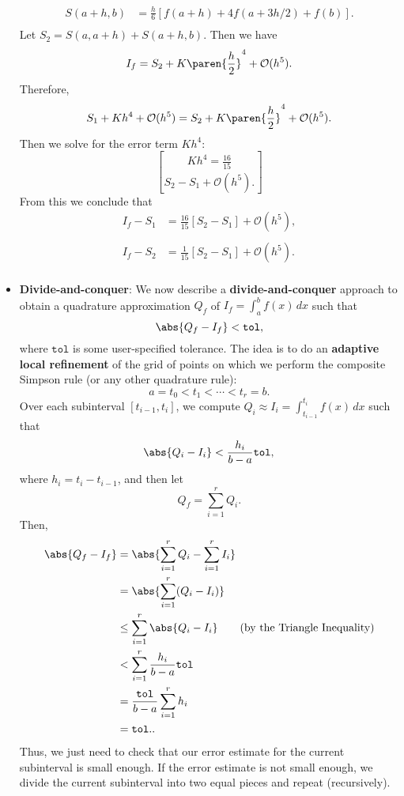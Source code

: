 \documentclass{report}
\begin{document}
\begin{itemize}
\begin{align*}
                S(a+h,b) &= \frac{h}{6}\left[f(a+h) + 4f(a + 3h/2) + f(b)\right].\\
            \end{align*}
            Let $S_2 = S(a,a+h) + S(a+h,b)$.
            \bigbreak \noindent 
            Then we have
            $$I_f = S_2 + K\paren{\frac{h}{2}}^4 + \mathcal{O}(h^5).$$
            \bigbreak \noindent 
            Therefore,
            $$S_1 + Kh^4 + \mathcal{O}(h^5) = S_2 + K\paren{\frac{h}{2}}^4 + \mathcal{O}(h^5).$$
            Then we solve for the error term $Kh^4$:
            $$Kh^4 = \frac{16}{15}\brack{S_2 - S_1} + \mathcal{O}(h^5).$$
            \bigbreak \noindent 
            From this we conclude that
            \begin{align*}
                I_f - S_1 &= \frac{16}{15}\left[S_2 - S_1\right] + \mathcal{O}(h^5),\\
                \\
                I_f - S_2 &= \frac{1}{15}\left[S_2 - S_1\right] + \mathcal{O}(h^5).\\
            \end{align*}
        \item \textbf{Divide-and-conquer}: We now describe a \textbf{divide-and-conquer} approach to obtain a quadrature approximation $Q_f$ of $I_f = \int_a^b f(x)\,dx$ such that
            $$\abs{Q_f - I_f} < \mathtt{tol},$$
            where $\mathtt{tol}$ is some user-specified tolerance.
            \bigbreak \noindent 
            The idea is to do an \textbf{adaptive local refinement} of the grid of points on which we perform the composite Simpson rule (or any other quadrature rule):
            $$a = t_0 < t_1 < \cdots < t_r = b.$$
            Over each subinterval $[t_{i-1}, t_i]$, we compute $Q_i \approx I_i = \int_{t_{i-1}}^{t_i} f(x)\,dx$ such that
            $$\abs{Q_i - I_i} < \frac{h_i}{b-a}\mathtt{tol},$$
            where $h_i = t_i - t_{i-1}$, and then let
            $$Q_f = \sum_{i=1}^r Q_i.$$
            Then,
            \begin{align*}
                \abs{Q_f - I_f}
                &= \abs{\sum_{i=1}^r Q_i - \sum_{i=1}^r I_i} \\
                &= \abs{\sum_{i=1}^r (Q_i - I_i)} \\
                &\leq \sum_{i=1}^r \abs{ Q_i - I_i} \qquad \text{(by the Triangle Inequality)}\\
                &< \sum_{i=1}^r \frac{h_i}{b - a} \mathtt{tol} \\
                &= \frac{\mathtt{tol}}{b - a}  \sum_{i=1}^r h_i \\
                &= \mathtt{tol}.
            .\end{align*}
            \bigbreak \noindent 
            Thus, we just need to check that our error estimate for the current subinterval is small enough.
            \bigbreak \noindent 
            If the error estimate is not small enough, we divide the current subinterval into two equal pieces and repeat (recursively).
    \end{itemize}



    
\end{document}
